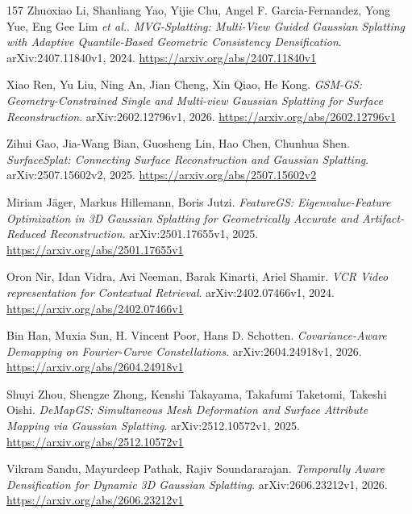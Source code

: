 \documentclass[11pt,a4paper]{article}
\begin{document}
\begin{thebibliography}{157}
Zhuoxiao Li, Shanliang Yao, Yijie Chu, Angel F. Garcia-Fernandez, Yong Yue, Eng Gee Lim \emph{et al.}.
\newblock \emph{MVG-Splatting: Multi-View Guided Gaussian Splatting with Adaptive Quantile-Based Geometric Consistency Densification}.
\newblock arXiv:2407.11840v1, 2024.
\newblock \url{https://arxiv.org/abs/2407.11840v1}

Xiao Ren, Yu Liu, Ning An, Jian Cheng, Xin Qiao, He Kong.
\newblock \emph{GSM-GS: Geometry-Constrained Single and Multi-view Gaussian Splatting for Surface Reconstruction}.
\newblock arXiv:2602.12796v1, 2026.
\newblock \url{https://arxiv.org/abs/2602.12796v1}

Zihui Gao, Jia-Wang Bian, Guosheng Lin, Hao Chen, Chunhua Shen.
\newblock \emph{SurfaceSplat: Connecting Surface Reconstruction and Gaussian Splatting}.
\newblock arXiv:2507.15602v2, 2025.
\newblock \url{https://arxiv.org/abs/2507.15602v2}

Miriam J\"{a}ger, Markus Hillemann, Boris Jutzi.
\newblock \emph{FeatureGS: Eigenvalue-Feature Optimization in 3D Gaussian Splatting for Geometrically Accurate and Artifact-Reduced Reconstruction}.
\newblock arXiv:2501.17655v1, 2025.
\newblock \url{https://arxiv.org/abs/2501.17655v1}

Oron Nir, Idan Vidra, Avi Neeman, Barak Kinarti, Ariel Shamir.
\newblock \emph{VCR Video representation for Contextual Retrieval}.
\newblock arXiv:2402.07466v1, 2024.
\newblock \url{https://arxiv.org/abs/2402.07466v1}

Bin Han, Muxia Sun, H. Vincent Poor, Hans D. Schotten.
\newblock \emph{Covariance-Aware Demapping on Fourier-Curve Constellations}.
\newblock arXiv:2604.24918v1, 2026.
\newblock \url{https://arxiv.org/abs/2604.24918v1}

Shuyi Zhou, Shengze Zhong, Kenshi Takayama, Takafumi Taketomi, Takeshi Oishi.
\newblock \emph{DeMapGS: Simultaneous Mesh Deformation and Surface Attribute Mapping via Gaussian Splatting}.
\newblock arXiv:2512.10572v1, 2025.
\newblock \url{https://arxiv.org/abs/2512.10572v1}

Vikram Sandu, Mayurdeep Pathak, Rajiv Soundararajan.
\newblock \emph{Temporally Aware Densification for Dynamic 3D Gaussian Splatting}.
\newblock arXiv:2606.23212v1, 2026.
\newblock \url{https://arxiv.org/abs/2606.23212v1}


\end{thebibliography}
\end{document}
